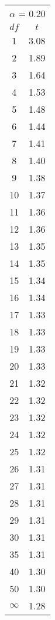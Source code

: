 \begin{tabular}{|c|c|}\hline
 \multicolumn{2}{|c|}{$\alpha$ = 0.20}\\
$df$ & $t$ \\ \hline
1 & 3.08\\
2 & 1.89\\
3 & 1.64\\
4 & 1.53\\
5 & 1.48\\
6 & 1.44\\
7 & 1.41\\
8 & 1.40\\
9 & 1.38\\
10 & 1.37\\
11 & 1.36\\
12 & 1.36\\
13 & 1.35\\
14 & 1.35\\
15 & 1.34\\
16 & 1.34\\
17 & 1.33\\
18 & 1.33\\
19 & 1.33\\
20 & 1.33\\
21 & 1.32\\
22 & 1.32\\
23 & 1.32\\
24 & 1.32\\
25 & 1.32\\
26 & 1.31\\
27 & 1.31\\
28 & 1.31\\
29 & 1.31\\
30 & 1.31\\
35 & 1.31\\
40 & 1.30\\
50 & 1.30\\
$\infty$ & 1.28\\
\hline \end{tabular}

